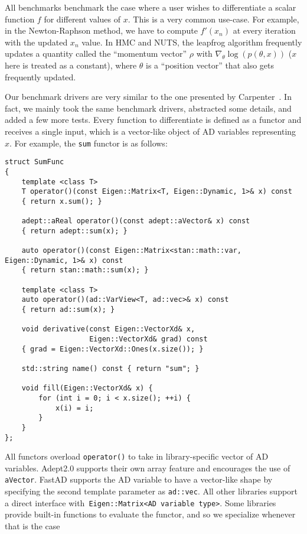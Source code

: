 All benchmarks benchmark the case where a user wishes to differentiate
a scalar function $f$ for different values of $x$.
This is a very common use-case.
For example, in the Newton-Raphson method,
we have to compute $f'(x_n)$ at every iteration with the updated $x_n$ value.
In HMC and NUTS, the leapfrog algorithm frequently
updates a quantity called the ``momentum vector'' $\rho$ 
with $\nabla_\theta \log(p(\theta, x))$ ($x$ here is treated as a constant),
where $\theta$ is a ``position vector'' that also gets frequently updated.

Our benchmark drivers are very similar to the one presented by Carpenter~\cite{carpenter:2015}.
In fact, we mainly took the same benchmark drivers, abstracted some details, and added a few more tests.
Every function to differentiate is defined as a functor and receives a single input,
which is a vector-like object of AD variables representing $x$.
For example, the \verb|sum| functor is as follows:
\begin{lstlisting}[style=customcpp]
struct SumFunc
{
    template <class T>
    T operator()(const Eigen::Matrix<T, Eigen::Dynamic, 1>& x) const
    { return x.sum(); }

    adept::aReal operator()(const adept::aVector& x) const
    { return adept::sum(x); }

    auto operator()(const Eigen::Matrix<stan::math::var, Eigen::Dynamic, 1>& x) const
    { return stan::math::sum(x); }

    template <class T>
    auto operator()(ad::VarView<T, ad::vec>& x) const
    { return ad::sum(x); }

    void derivative(const Eigen::VectorXd& x,
                    Eigen::VectorXd& grad) const
    { grad = Eigen::VectorXd::Ones(x.size()); }

    std::string name() const { return "sum"; }

    void fill(Eigen::VectorXd& x) {
        for (int i = 0; i < x.size(); ++i) {
            x(i) = i;
        }
    }
};
\end{lstlisting}
All functors overload \verb|operator()| to take in library-specific vector of AD variables.
Adept2.0 supports their own array feature and encourages the use of \verb|aVector|.
FastAD supports the AD variable to have a vector-like shape by specifying the second template parameter as \verb|ad::vec|.
All other libraries support a direct interface with~\verb|Eigen::Matrix<AD variable type>|.
Some libraries provide built-in functions to evaluate the functor, and so we specialize whenever that is the case
